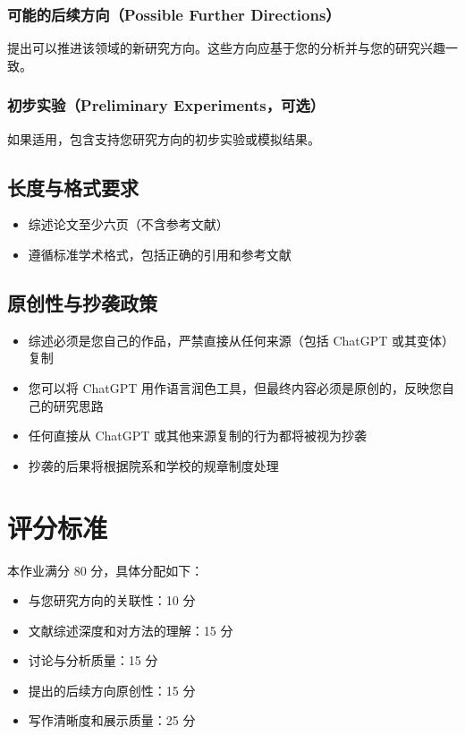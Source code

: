 \documentclass[UTF8]{article}
\begin{document}
\subsubsection{可能的后续方向（Possible Further Directions）}
提出可以推进该领域的新研究方向。这些方向应基于您的分析并与您的研究兴趣一致。

\subsubsection{初步实验（Preliminary Experiments，可选）}
如果适用，包含支持您研究方向的初步实验或模拟结果。

\subsection{长度与格式要求}

\begin{itemize}
    \item 综述论文至少六页（不含参考文献）
    \item 遵循标准学术格式，包括正确的引用和参考文献
\end{itemize}

\subsection{原创性与抄袭政策}

\begin{itemize}
    \item 综述必须是您自己的作品，严禁直接从任何来源（包括 ChatGPT 或其变体）复制
    \item 您可以将 ChatGPT 用作语言润色工具，但最终内容必须是原创的，反映您自己的研究思路
    \item 任何直接从 ChatGPT 或其他来源复制的行为都将被视为抄袭
    \item 抄袭的后果将根据院系和学校的规章制度处理
\end{itemize}

\section{评分标准}

本作业满分 80 分，具体分配如下：

\begin{itemize}
    \item 与您研究方向的关联性：10 分
    \item 文献综述深度和对方法的理解：15 分
    \item 讨论与分析质量：15 分
    \item 提出的后续方向原创性：15 分
    \item 写作清晰度和展示质量：25 分
\end{itemize}
\end{document}
